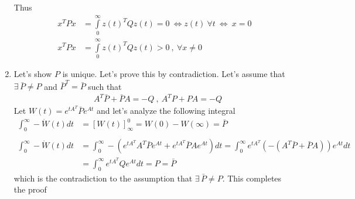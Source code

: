 \documentclass[twoside]{article}
\begin{document}
\begin{enumerate}
%
Thus 
%
\begin{align*}
x^T P x &= \int\limits_{0}^{\infty} z(t)^T Q z(t) = 0 \ \iff z(t) \ \forall t 
\ \iff \ x = 0
\\
x^T P x &= \int\limits_{0}^{\infty} z(t)^T Q z(t) > 0 \ , \ \forall x \neq 0
\end{align*}
%
\item Let's show $P$ is unique. Let's prove this by contradiction.
Let's assume that $\exists \, \bar{P} \neq P$ and $\bar{P}^T = \bar{P}$ 
such that  
%
\begin{align*}
&A^T \bar{P} + \bar{P} A = - Q \ , \ A^T P + P A = - Q
\end{align*}
%
Let $W(t) = e^{t A^T} \bar{P} e^{A t}$ and let's analyze the following integral  
%
\begin{align*}
\int_{0}^{\infty} - \dot{W}(t) dt &= \left[ W(t) \right]^{0}_{\infty} = W(0) - W(\infty) = \bar{P}
\\
\\
\int_{0}^{\infty} - \dot{W}(t) dt &=
\int_{0}^{\infty} - \left( e^{t A^T} A^T \bar{P} e^{A t} +
e^{t A^T}\bar{P} A e^{A t} 
\right) dt =
\int_{0}^{\infty} e^{t A^T} ( - \left( A^T \bar{P} +
 \bar{P} A \right) ) e^{A t} dt
 \\
 &= \int_{0}^{\infty} e^{t A^T} Q e^{A t} dt = P = \bar{P}
\end{align*}
%
which is the contradiction to the assumption that $\exists \, \bar{P} \neq P$. This completes the proof
\end{enumerate}


\end{document}
